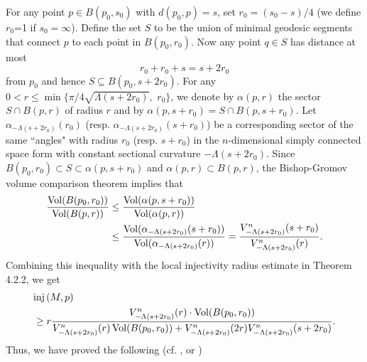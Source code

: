 For any point $p\in B(p_0, s_0)$ with $d(p_0, p)=s$, set
$r_0=(s_0-s)/4$ (we define $r_0$=1 if $s_0=\infty$). Define the
set $S$ to be the union of minimal geodesic segments that connect
$p$ to each point in $B(p_0, r_0)$. Now any point $q\in S$ has
distance at most
$$
r_0+r_0+s=s+2r_0
$$
from $p_0$ and hence $S\subseteq B(p_0, s+2r_0)$. For any $0<r\le
\min\{\pi/4\sqrt{\Lambda(s+2r_0)},$ $r_0\}$, we denote by $\alpha
(p, r)$ the sector $S\cap B(p,r)$ of radius $r$ and by $\alpha (p,
s+r_0)=S \cap B(p,s+r_0)$. Let $\alpha_{-\Lambda(s+2r_0)}(r_0)$
(resp. $\alpha_{-\Lambda(s+2r_0)} (s+r_0)$) be a corresponding
sector of the same ``angles" with radius $r_0$ (resp. $s+r_0$) in
the $n$-dimensional simply connected space form with constant
sectional curvature $-\Lambda(s+2r_0)$. Since $B(p_0, r_0)\subset
S\subset\alpha (p,s+r_0)$ and $\alpha (p, r)\subset B(p,r)$, the
Bishop-Gromov volume comparison theorem implies that
\begin{align*}
\frac{\operatorname{Vol}(B(p_0,r_0))}{\operatorname{Vol}(B(p,r))}
&\le \frac{\operatorname{Vol}(\alpha (p,s+r_0))}{\operatorname{Vol}(\alpha (p,r))} \\
&\le\frac{\operatorname{Vol}(\alpha_{-\Lambda(s+2r_0)}(s+r_0))}{\operatorname{Vol}(\alpha_
{-\Lambda(s+2r_0)}(r))}=\frac{V^n_{-\Lambda(s+2r_0)}(s+r_0)}{V^n_
{-\Lambda(s+2r_0)}(r)}.
\end{align*}
Combining this inequality with the local injectivity radius
estimate in Theorem 4.2.2, we get
\begin{align*}
&{\rm inj}\,(M,p) \\
&\geq r \frac{V^{n}_{-\Lambda(s+2r_0)}(r)\cdot
\operatorname{Vol}(B(p_0,r_0))}{V^{n}_{-\Lambda(s+2r_0)}(r)\operatorname{Vol}(B(p_0,r_0))+
V_{-\Lambda(s+2r_0)}^n(2r)V^{n}_{-\Lambda(s+2r_0)}(s+2r_0)}.
\end{align*}
Thus, we have proved the following (cf. \cite{CLY}, \cite{CGT} or
\cite{AM})

